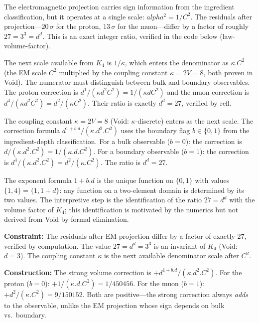 \documentclass[11pt,a4paper]{book}
\def\alpha{alpha}%
\def\cdot{.}%
\def\texttt#1{#1}%
\begin{document}
The electromagnetic projection carries sign information from the
ingredient classification, but it operates at a single scale:
$\alpha^2 = 1/C^2$.  The residuals after projection---$20\,\sigma$
for the proton, $13\,\sigma$ for the muon---differ by a factor of
roughly $27 = 3^3 = d^d$.  This is an exact integer ratio, verified
in the code below (\texttt{law-volume-factor}).

The next scale available from $K_4$ is $1/\kappa$, which enters the
denominator as $\kappa \cdot C^2$ (the EM scale $C^2$ multiplied by
the coupling constant $\kappa = 2V = 8$, both proven in Void).
The numerator must distinguish between bulk and boundary observables.
The proton correction is $d^1 / (\kappa d^2 C^2) = 1/(\kappa d C^2)$
and the muon correction is $d^4 / (\kappa d^2 C^2) = d^2/(\kappa C^2)$.
Their ratio is exactly $d^d = 27$, verified by \texttt{refl}.

The coupling constant $\kappa = 2V = 8$ (Void: \texttt{$\kappa$-discrete})
enters as the next scale. The correction formula
$d^{1 + b \cdot d}/(\kappa \cdot d^2 \cdot C^2)$ uses the boundary flag
$b \in \{0, 1\}$ from the ingredient-depth classification.
For a bulk observable ($b = 0$): the correction
is $d/(\kappa \cdot d^2 \cdot C^2) = 1/(\kappa \cdot d \cdot C^2)$.
For a boundary observable ($b = 1$): the correction
is $d^4/(\kappa \cdot d^2 \cdot C^2) = d^2/(\kappa \cdot C^2)$.
The ratio is $d^d = 27$.

The exponent formula $1 + b \cdot d$ is the unique function on
$\{0,1\}$ with values $\{1, 4\} = \{1, 1+d\}$: any function on a
two-element domain is determined by its two values.
The interpretive step is the identification of the ratio $27 = d^d$
with the volume factor of $K_4$; this identification is motivated by
the numerics but not derived from Void by formal elimination.

\medskip
\noindent
\textbf{Constraint:}
The residuals after EM projection differ by a factor of exactly $27$,
verified by computation.  The value $27 = d^d = 3^3$ is an invariant
of $K_4$ (Void: $d = 3$).  The coupling constant $\kappa$ is the
next available denominator scale after $C^2$.

\medskip
\noindent
\textbf{Construction:}
The strong volume correction is
$+ d^{1+b \cdot d}/(\kappa \cdot d^2 \cdot C^2)$.
For the proton ($b = 0$): $+1/(\kappa \cdot d \cdot C^2) = 1/450456$.
For the muon ($b = 1$): $+d^2/(\kappa \cdot C^2) = 9/150152$.
Both are positive---the strong correction always \emph{adds} to the
observable, unlike the EM projection whose sign depends on bulk vs.\
boundary.
\end{document}
